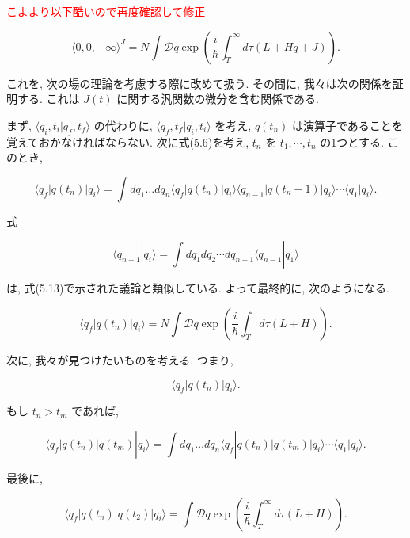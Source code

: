 \documentclass{jsarticle}
\begin{document}
\textcolor{red}{こよより以下酷いので再度確認して修正\\}

\begin{equation*}
\langle 0, 0, -\infty \rangle^J = N \int \mathcal{D}q \exp \left( \frac{i}{\hbar} \int_T^\infty d\tau \left( L + H q + J \right) \right).
\end{equation*}

これを, 次の場の理論を考慮する際に改めて扱う. その間に, 我々は次の関係を証明する. これは \( J(t) \) に関する汎関数の微分を含む関係である.


まず, \( \langle q_i, t_i | q_f, t_f \rangle \) の代わりに, \( \langle q_f, t_f | q_i, t_i \rangle \) を考え, \( q(t_n) \) は演算子であることを覚えておかなければならない. 次に式(5.6)を考え, \( t_n \) を \( t_1, \cdots, t_n \) の1つとする. このとき,

\begin{equation*}
\langle q_f | q(t_n) | q_i \rangle = \int dq_1 \dots dq_n \langle q_f | q(t_n) | q_i \rangle \langle q_{n-1} | q(t_n-1) | q_i \rangle \cdots \langle q_1 | q_i \rangle.
\end{equation*}

式

\begin{equation*}
\langle q_{n-1} | q_i \rangle = \int dq_1 dq_2 \cdots dq_{n-1} \langle q_{n-1} | q_1 \rangle
\end{equation*}

は, 式(5.13)で示された議論と類似している. よって最終的に, 次のようになる.

\begin{equation*}
\langle q_f | q(t_n) | q_i \rangle = N \int \mathcal{D}q \exp \left( \frac{i}{\hbar} \int_{T} d\tau (L + H) \right). \tag{5.69}
\end{equation*}

次に, 我々が見つけたいものを考える. つまり,

\begin{equation*}
\langle q_f | q(t_n) | q_i \rangle.
\end{equation*}

もし \( t_n > t_m \) であれば,

\begin{equation*}
\langle q_f | q(t_n) | q(t_m) | q_i \rangle = \int dq_1 \dots dq_n \langle q_f | q(t_n) | q(t_m) | q_i \rangle \cdots \langle q_1 | q_i \rangle.
\end{equation*}

最後に,

\begin{equation*}
\langle q_f | q(t_n) | q(t_2) | q_i \rangle = \int \mathcal{D}q \exp \left( \frac{i}{\hbar} \int_T^\infty d\tau (L + H) \right). \tag{5.70}
\end{equation*}
\end{document}
